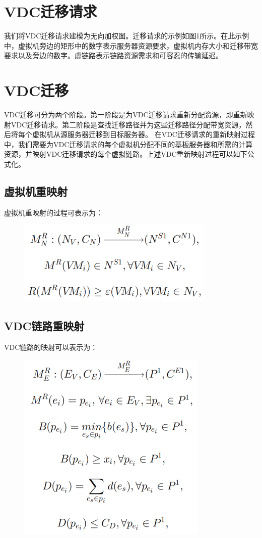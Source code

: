 \section{VDC迁移请求}
我们将VDC迁移请求建模为无向加权图。迁移请求的示例如图1所示。在此示例中，虚拟机旁边的矩形中的数字表示服务器资源要求，虚拟机内存大小和迁移带宽要求以及旁边的数字。虚链路表示链路资源需求和可容忍的传输延迟。

\section{VDC迁移}
VDC迁移可分为两个阶段。第一阶段是为VDC迁移请求重新分配资源，即重新映射VDC迁移请求。第二阶段是查找迁移路径并为这些迁移路径分配带宽资源，然后将每个虚拟机从源服务器迁移到目标服务器。
在VDC迁移请求的重新映射过程中，我们需要为VDC迁移请求的每个虚拟机分配不同的基板服务器和所需的计算资源，并映射VDC迁移请求的每个虚拟链路。上述VDC重新映射过程可以如下公式化。

\subsection{虚拟机重映射}
虚拟机重映射的过程可表示为：

\begin{figure}[!htb]
  \centering
  \includegraphics{./Figure/express1.png}
\end{figure}

\subsection{VDC链路重映射}
VDC链路的映射可以表示为：

\begin{figure}[!htb]
  \centering
  \includegraphics{./Figure/express2.png}
\end{figure}

